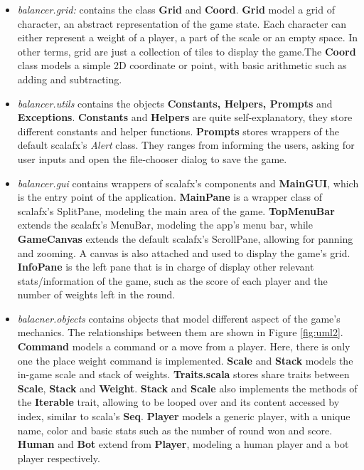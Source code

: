 \documentclass[12pt]{article}
\begin{document}
\begin{itemize}
  \item \textit{balancer.grid:} contains the class \textbf{Grid} and
    \textbf{Coord}. \textbf{Grid} model a grid of character, an abstract
    representation of the game state. Each character can either represent a
    weight of a player, a part of the scale or an empty space. In other terms,
    grid are just a collection of tiles to display the game.The \textbf{Coord}
    class models a simple 2D coordinate or point, with basic arithmetic such as
    adding and subtracting.
  \item \textit{balancer.utils} contains the objects \textbf{Constants, Helpers,
    Prompts} and \textbf{Exceptions}. \textbf{Constants} and \textbf{Helpers}
    are quite self-explanatory, they store different constants and helper
    functions. \textbf{Prompts} stores wrappers of the default scalafx's
    \textit{Alert} class. They ranges from informing the users, asking for user
    inputs and open the file-chooser dialog to save the game.
  \item \textit{balancer.gui} contains wrappers of scalafx's components and
    \textbf{MainGUI}, which is the entry point of the application.
    \textbf{MainPane} is a wrapper class of scalafx's SplitPane, modeling the
    main area of the game. \textbf{TopMenuBar} extends the scalafx's MenuBar,
    modeling the app's menu bar, while \textbf{GameCanvas} extends the default
    scalafx's ScrollPane, allowing for panning and zooming. A canvas is also
    attached and used to display the game's grid. \textbf{InfoPane} is the left
    pane that is in charge of display other relevant stats/information of the
    game, such as the score of each player and the number of weights left in the
    round.

  \item \textit{balacner.objects} contains objects that model different aspect
    of the game's mechanics. The relationships between them are shown in Figure
    \ref{fig:uml2}. \textbf{Command} models a command or a move from a player.
    Here, there is only one the place weight command is implemented.
    \textbf{Scale} and \textbf{Stack} models the in-game scale and stack of
    weights. \textbf{Traits.scala} stores share traits between \textbf{Scale},
    \textbf{Stack} and \textbf{Weight}. \textbf{Stack} and \textbf{Scale} also
    implements the methods of the \textbf{Iterable} trait, allowing to be looped
    over and its content accessed by index, similar to scala's \textbf{Seq}.
    \textbf{Player} models a generic player, with a unique name, color and basic
    stats such as the number of round won and score. \textbf{Human} and
    \textbf{Bot} extend from \textbf{Player}, modeling a human player and a bot
    player respectively.

\end{itemize}
\end{document}
